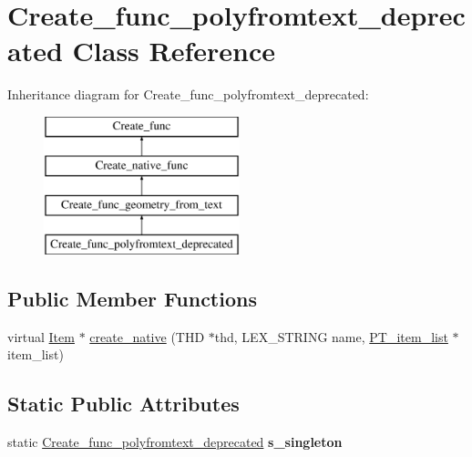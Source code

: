 \hypertarget{classCreate__func__polyfromtext__deprecated}{}\section{Create\+\_\+func\+\_\+polyfromtext\+\_\+deprecated Class Reference}
\label{classCreate__func__polyfromtext__deprecated}
Inheritance diagram for Create\+\_\+func\+\_\+polyfromtext\+\_\+deprecated\+:\begin{figure}[H]
\begin{center}
\leavevmode
\includegraphics[height=4.000000cm]{classCreate__func__polyfromtext__deprecated}
\end{center}
\end{figure}
\subsection*{Public Member Functions}
\begin{DoxyCompactItemize}
\item 
virtual \mbox{\hyperlink{classItem}{Item}} $\ast$ \mbox{\hyperlink{classCreate__func__polyfromtext__deprecated_ae2d1f5b987f4eee048383dff2fbb7d92}{create\+\_\+native}} (T\+HD $\ast$thd, L\+E\+X\+\_\+\+S\+T\+R\+I\+NG name, \mbox{\hyperlink{classPT__item__list}{P\+T\+\_\+item\+\_\+list}} $\ast$item\+\_\+list)
\end{DoxyCompactItemize}
\subsection*{Static Public Attributes}
\begin{DoxyCompactItemize}
\item 
\mbox{\label{classCreate__func__polyfromtext__deprecated_a0b60e7880f4a1510c83672cce3a7ea6d}} 
static \mbox{\hyperlink{classCreate__func__polyfromtext__deprecated}{Create\+\_\+func\+\_\+polyfromtext\+\_\+deprecated}} {\bfseries s\+\_\+singleton}
\end{DoxyCompactItemize}
